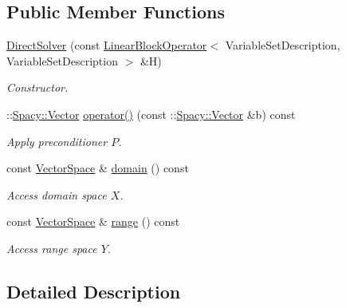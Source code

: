 \subsection*{Public Member Functions}
\begin{DoxyCompactItemize}
\item 
\hyperlink{classSpacy_1_1KaskadeParabolic_1_1PDE_1_1DirectSolver_a375dcbd9c8034064d106b80b1f6d58a5}{Direct\-Solver} (const \hyperlink{classSpacy_1_1KaskadeParabolic_1_1PDE_1_1LinearBlockOperator}{Linear\-Block\-Operator}$<$ Variable\-Set\-Description, Variable\-Set\-Description $>$ \&H)
\begin{DoxyCompactList}\small\item\em Constructor. \end{DoxyCompactList}\item 
\-::\hyperlink{classSpacy_1_1Vector}{Spacy\-::\-Vector} \hyperlink{classSpacy_1_1KaskadeParabolic_1_1PDE_1_1DirectSolver_a390097a7976ce19d966baccbde22b388}{operator()} (const \-::\hyperlink{classSpacy_1_1Vector}{Spacy\-::\-Vector} \&b) const 
\begin{DoxyCompactList}\small\item\em Apply preconditioner $P$. \end{DoxyCompactList}\item 
\hypertarget{classSpacy_1_1OperatorBase_a2588f9b3e0188820c4c494e63293dc6f}{const \hyperlink{classSpacy_1_1VectorSpace}{Vector\-Space} \& \hyperlink{classSpacy_1_1OperatorBase_a2588f9b3e0188820c4c494e63293dc6f}{domain} () const }\label{classSpacy_1_1OperatorBase_a2588f9b3e0188820c4c494e63293dc6f}

\begin{DoxyCompactList}\small\item\em Access domain space $X$. \end{DoxyCompactList}\item 
\hypertarget{classSpacy_1_1OperatorBase_ab19d3b7a6f290b1079248f1e567e53d6}{const \hyperlink{classSpacy_1_1VectorSpace}{Vector\-Space} \& \hyperlink{classSpacy_1_1OperatorBase_ab19d3b7a6f290b1079248f1e567e53d6}{range} () const }\label{classSpacy_1_1OperatorBase_ab19d3b7a6f290b1079248f1e567e53d6}

\begin{DoxyCompactList}\small\item\em Access range space $Y$. \end{DoxyCompactList}\end{DoxyCompactItemize}


\subsection{Detailed Description}
